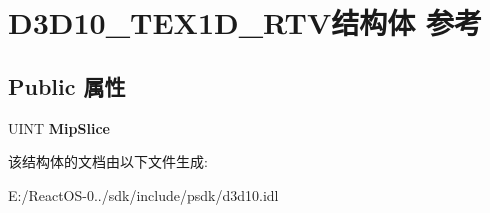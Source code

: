 \hypertarget{struct_d3_d10___t_e_x1_d___r_t_v}{}\section{D3\+D10\+\_\+\+T\+E\+X1\+D\+\_\+\+R\+T\+V结构体 参考}
\label{struct_d3_d10___t_e_x1_d___r_t_v}
\subsection*{Public 属性}
\begin{DoxyCompactItemize}
\item 
\mbox{\label{struct_d3_d10___t_e_x1_d___r_t_v_aea10458d3ec44858da4f9d087f165e0e}} 
U\+I\+NT {\bfseries Mip\+Slice}
\end{DoxyCompactItemize}


该结构体的文档由以下文件生成\+:\begin{DoxyCompactItemize}
\item 
E\+:/\+React\+O\+S-\/0../sdk/include/psdk/d3d10.\+idl\end{DoxyCompactItemize}
